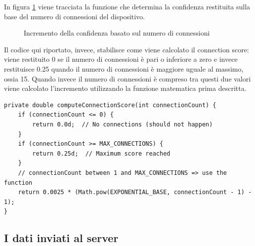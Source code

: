 In figura \ref{fig:confidence-func} viene tracciata la funzione che determina la confidenza restituita sulla base del numero di connessioni del dispositivo. 

\begin{figure}[H]
    \centering
    \caption{Incremento della confidenza basato sul numero di connessioni}
    \label{fig:confidence-func}
\end{figure}

Il codice qui riportato, invece, stabilisce come viene calcolato il connection score: viene restituito 0 se il numero di connessioni è pari o inferiore a zero e invece restituisce 0.25 quando il numero di connessioni è maggiore uguale al massimo, ossia 15. Quando invece il numero di connessioni è compreso tra questi due valori viene calcolato l'incremento utilizzando la funzione matematica prima descritta.
\begin{verbatim}
private double computeConnectionScore(int connectionCount) {
    if (connectionCount <= 0) {
        return 0.0d;  // No connections (should not happen)
    }
    if (connectionCount >= MAX_CONNECTIONS) {
        return 0.25d;  // Maximum score reached
    }
    // connectionCount between 1 and MAX_CONNECTIONS => use the function
    return 0.0025 * (Math.pow(EXPONENTIAL_BASE, connectionCount - 1) - 1);
}
\end{verbatim}

\subsection{I dati inviati al server}

